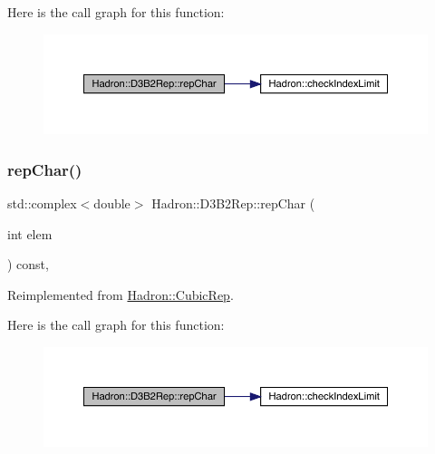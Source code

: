 Here is the call graph for this function\+:
\nopagebreak
\begin{figure}[H]
\begin{center}
\leavevmode
\includegraphics[width=350pt]{d3/d61/structHadron_1_1D3B2Rep_a905f3eda8837cdc95ef5c897f8ea4bd7_cgraph}
\end{center}
\end{figure}
\mbox{\label{structHadron_1_1D3B2Rep_a905f3eda8837cdc95ef5c897f8ea4bd7}} 
\subsubsection{\texorpdfstring{repChar()}{repChar()}\hspace{0.1cm}{\footnotesize\ttfamily [2/2]}}
{\footnotesize\ttfamily std\+::complex$<$double$>$ Hadron\+::\+D3\+B2\+Rep\+::rep\+Char (\begin{DoxyParamCaption}\item[{int}]{elem }\end{DoxyParamCaption}) const\hspace{0.3cm}{\ttfamily [inline]}, {\ttfamily [virtual]}}



Reimplemented from \mbox{\hyperlink{structHadron_1_1CubicRep_af45227106e8e715e84b0af69cd3b36f8}{Hadron\+::\+Cubic\+Rep}}.

Here is the call graph for this function\+:
\nopagebreak
\begin{figure}[H]
\begin{center}
\leavevmode
\includegraphics[width=350pt]{d3/d61/structHadron_1_1D3B2Rep_a905f3eda8837cdc95ef5c897f8ea4bd7_cgraph}
\end{center}
\end{figure}
\mbox{\label{structHadron_1_1D3B2Rep_a3e946b6e27ca026d8e7b1bcd02471deb}} 
